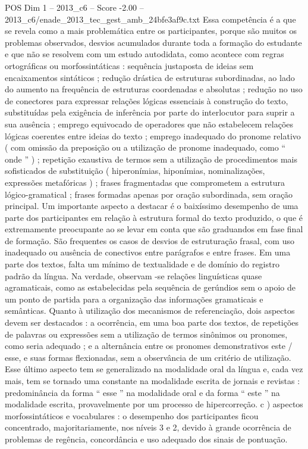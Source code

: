 \begin{textsample}{POS Dim 1 – 2013\_c6 – Score -2.00 – 2013\_c6/enade\_2013\_tec\_gest\_amb\_24bfe3af9c.txt}
Essa competência é a que se revela como a mais problemática entre os participantes, porque são muitos os problemas observados, desvios acumulados durante toda a formação do estudante e que não se resolvem com um estudo autodidata, como acontece com regras ortográficas ou morfossintáticas : sequência justaposta de ideias sem encaixamentos sintáticos ; redução drástica de estruturas subordinadas, ao lado do aumento na frequência de estruturas coordenadas e absolutas ; redução no uso de conectores para expressar relações lógicas essenciais à construção do texto, substituídas pela exigência de inferência por parte do interlocutor para suprir a sua ausência ; emprego equivocado de operadores que não estabelecem relações lógicas coerentes entre ideias do texto ; emprego inadequado do pronome relativo ( com omissão da preposição ou a utilização de pronome inadequado, como “ onde ” ) ; repetição exaustiva de termos sem a utilização de procedimentos mais sofisticados de substituição ( hiperonímias, hiponímias, nominalizações, expressões metafóricas ) ; frases fragmentadas que comprometem a estrutura lógico-gramatical ; frases formadas apenas por oração subordinada, sem oração principal.
Um importante aspecto a destacar é o baixíssimo desempenho de uma parte dos participantes em relação à estrutura formal do texto produzido, o que é extremamente preocupante ao se levar em conta que são graduandos em fase final de formação.
São frequentes os casos de desvios de estruturação frasal, com uso inadequado ou ausência de conectivos entre parágrafos e entre frases.
Em uma parte dos textos, falta um mínimo de textualidade e de domínio do registro padrão da língua.
Na verdade, observam -se relações linguísticas quase agramaticais, como as estabelecidas pela sequência de gerúndios sem o apoio de um ponto de partida para a organização das informações gramaticais e semânticas.
Quanto à utilização dos mecanismos de referenciação, dois aspectos devem ser destacados : a ocorrência, em uma boa parte dos textos, de repetições de palavras ou expressões sem a utilização de termos sinônimos ou pronomes, como seria adequado ; e a alternância entre os pronomes demonstrativos este / esse, e suas formas flexionadas, sem a observância de um critério de utilização.
Esse último aspecto tem se generalizado na modalidade oral da língua e, cada vez mais, tem se tornado uma constante na modalidade escrita de jornais e revistas : predominância da forma “ esse ” na modalidade oral e da forma “ este ” na modalidade escrita, provavelmente por um processo de hipercorreção. c ) aspectos morfossintáticos e vocabulares : o desempenho dos participantes ficou concentrado, majoritariamente, nos níveis 3 e 2, devido à grande ocorrência de problemas de regência, concordância e uso adequado dos sinais de pontuação.

\end{textsample}

